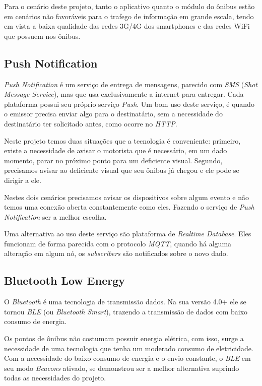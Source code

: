 \documentclass[
	12pt,				%
	oneside,			%
	a4paper,			%
	brazil				%
]{abntex2}
\begin{document}
Para o cenário deste projeto, tanto o aplicativo quanto o módulo do ônibus estão em cenários não favoráveis para o trafego de informação em grande escala, tendo em vista a baixa qualidade das redes 3G/4G dos smartphones e das redes WiFi que possuem nos ônibus.

\subsection{Push Notification}

\textit{Push Notification} é um serviço de entrega de mensagens, parecido com \textit{SMS} (\textit{Shot Message Service}), mas que usa exclusivamente a internet para entregar. Cada plataforma possui seu próprio serviço \textit{Push}. Um bom uso deste serviço, é quando o emissor precisa enviar algo para o destinatário, sem a necessidade do destinatário ter solicitado antes, como ocorre no \textit{HTTP}.

Neste projeto temos duas situações que a tecnologia é conveniente: primeiro, existe a necessidade de avisar o motorista que é necessário, em um dado momento, parar no próximo ponto para um deficiente visual. Segundo, precisamos avisar ao deficiente visual que seu ônibus já chegou e ele pode se dirigir a ele.

Nestes dois cenários precisamos avisar os dispositivos sobre algum evento e não temos uma conexão aberta constantemente como eles. Fazendo o serviço de \textit{Push Notification} ser a melhor escolha.

Uma alternativa ao uso deste serviço são plataforma de \textit{Realtime Database}. Eles funcionam de forma parecida com o protocolo \textit{MQTT}, quando há alguma alteração em algum nó, os \textit{subscribers} são notificados sobre o novo dado.

\subsection{Bluetooth Low Energy}

O \textit{Bluetooth} é uma tecnologia de transmissão dados. Na sua versão 4.0+ ele se tornou \textit{BLE} (ou \textit{Bluetooth Smart}), trazendo a transmissão de dados com baixo consumo de energia.

Os pontos de ônibus não costumam possuir energia elétrica, com isso, surge a necessidade de uma tecnologia que tenha um moderado consumo de eletricidade. Com a necessidade do baixo consumo de energia e o envio constante, o \textit{BLE} em seu modo \textit{Beacons} ativado, se demonstrou ser a melhor alternativa suprindo todas as necessidades do projeto.
\end{document}
